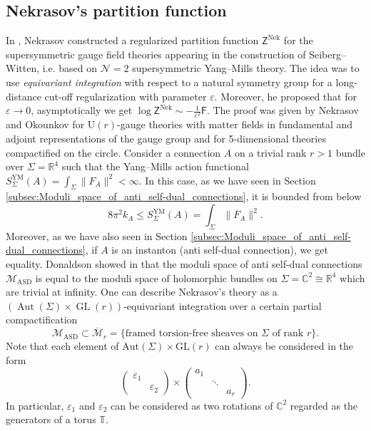 \documentclass[11pt,colorinlistoftodos]{amsart}
\numberwithin{equation}{subsection}
\theoremstyle{plain}
\theoremstyle{definition}
\theoremstyle{remark}
\newcommand{\R}{\mathbb{R}}
\DeclareMathOperator{\GL}{GL}
\newcommand{\C}{\mathbb{C}}
\DeclareMathOperator{\Aut}{Aut}
\newcommand{\calM}{\mathcal{M}}
\newcommand{\calN}{\mathcal{N}}
\begin{document}
\subsection{Nekrasov's partition function}
In \cite{Nekrasov2003}, Nekrasov constructed a regularized partition function $\mathsf{Z}^\mathrm{Nek}$ for the supersymmetric gauge field theories appearing in the construction of Seiberg--Witten, i.e. based on $\calN=2$ supersymmetric Yang--Mills theory. The idea was to use \emph{equivariant integration} with respect to a natural symmetry group for a long-distance cut-off regularization with parameter $\varepsilon$. Moreover, he proposed that for $\varepsilon\to 0$, asymptotically we get $\log\mathsf{Z}^\mathrm{Nek}\sim -\frac{1}{\varepsilon^2}\mathsf{F}$. The proof was given by Nekrasov and Okounkov for $\mathrm{U}(r)$-gauge theories with matter fields in fundamental and adjoint representations of the gauge group and for 5-dimensional theories compactified on the circle.
Consider a connection $A$ on a trivial rank $r>1$ bundle over $\Sigma=\R^4$ such that the Yang--Mills action functional $S^{\mathrm{YM}}_\Sigma(A)=\int_\Sigma\|F_A\|^2<\infty$. In this case, as we have seen in Section \ref{subsec:Moduli_space_of_anti_self-dual_connections}, it is bounded from below 
\[
8\pi^2k_A\leq S^\mathrm{YM}_{\Sigma}(A)=\int_\Sigma\|F_A\|^2.
\]
Moreover, as we have also seen in Section \ref{subsec:Moduli_space_of_anti_self-dual_connections}, if $A$ is an instanton (anti self-dual connection), we get equality. Donaldson showed in \cite{Donaldson1984} that the moduli space of anti self-dual connections $\calM_\mathrm{ASD}$ is equal to the moduli space of holomorphic bundles on $\Sigma=\C^2\cong \R^4$ which are trivial at infinity. One can describe Nekrasov's theory as a $(\Aut(\Sigma)\times \GL(r))$-equivariant integration over a certain partial compactification 
\[
\calM_\mathrm{ASD}\subset \overline{\calM}_r=\{\text{framed torsion-free sheaves on $\Sigma$ of rank $r$}\}.
\]
Note that each element of $\mathrm{Aut}(\Sigma)\times \mathrm{GL}(r)$ can always be considered in the form 
\[
\begin{pmatrix}\varepsilon_1&\\& \varepsilon_2\end{pmatrix}\times \begin{pmatrix}a_1& & \\&\ddots&\\&&a_r\end{pmatrix}. 
\]
In particular, $\varepsilon_1$ and $\varepsilon_2$ can be considered as two rotations of $\C^2$ regarded as the generators of a torus $\mathbb{T}$. 
\end{document}
